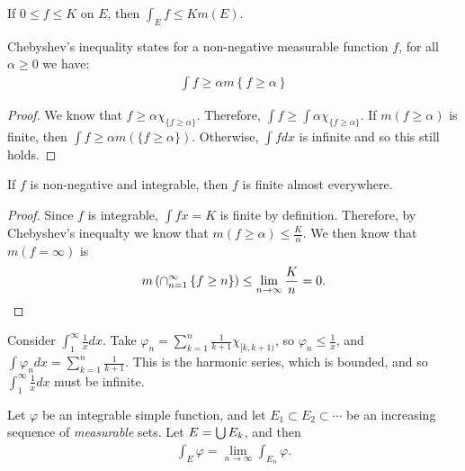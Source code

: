 \begin{lemma}
    If $0 \leq f \leq K$ on $E$, then $\int_{E}f \leq Km(E)$.
\end{lemma}

\begin{lemma}
    Chebyshev's inequality states for a non-negative measurable function $f$, for all $\alpha \geq 0$ we have:
    \begin{align*}
        \int f \geq \alpha m\left\{f \geq \alpha\right\}
    \end{align*}
\end{lemma}

\begin{proof}
    We know that $f \geq \alpha\chi_{\{f \geq \alpha\}}$. Therefore, $\int f \geq \int\alpha\chi_{\{f \geq \alpha\}}$. If $m(f \geq \alpha)$ is finite, then $\int f \geq \alpha m\left(\{f \geq \alpha\}\right)$. Otherwise, $\int fdx$ is infinite and so this still holds.
\end{proof}

\begin{cor}
    If $f$ is non-negative and integrable, then $f$ is finite almost everywhere.
\end{cor}

\begin{proof}
    Since $f$ is integrable, $\int fx = K$ is finite by definition. Therefore, by Chebyshev's inequalty we know that $m(f \geq \alpha) \leq \frac{K}{\alpha}$. We then know that $m(f = \infty)$ is
    \begin{align*}
        m\left(\cap_{n=1}^{\infty}\left\{f \geq n\right\}\right) \leq \lim_{n\to\infty}\frac{K}{n} = 0.
    \end{align*}
\end{proof}

\begin{exmp}
    Consider $\int_{1}^{\infty}\frac{1}{x}dx$. Take $\varphi_n = \sum_{k=1}^{n}\frac{1}{k+1}\chi_{[k, k+1)}$, so $\varphi_n \leq \frac{1}{x}$, and $\int\varphi_n dx = \sum_{k=1}^{n}\frac{1}{k+1}$. This is the harmonic series, which is bounded, and so $\int_{1}^{\infty}\frac{1}{x}dx$ must be infinite.
\end{exmp}

\begin{prop}
    Let $\varphi$ be an integrable simple function, and let $E_1 \subset E_2 \subset \cdots$ be an increasing sequence of \emph{measurable} sets. Let $E = \bigcup E_k$, and then
    \begin{align*}
        \int_{E}\varphi = \lim_{n\to\infty}\int_{E_n}\varphi.
    \end{align*}
\end{prop}

